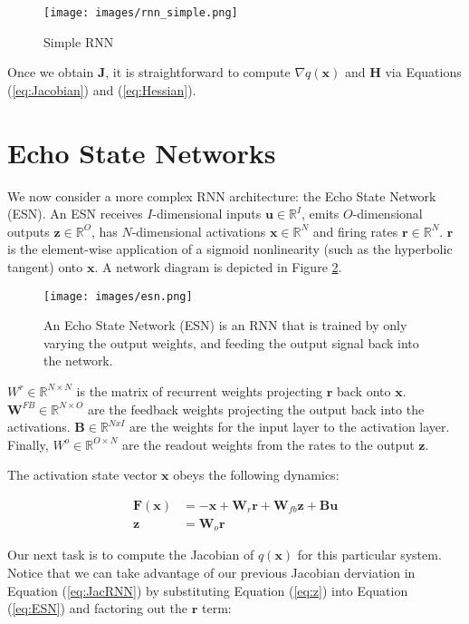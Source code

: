 \documentclass{article} %
\newcommand{\bf}[1]{\mathbf{#1}}
\newcommand{\x}{\bf{x}}
\newcommand{\J}{\bf{J}}
\begin{document}
\begin{figure}
\centering
\texttt{[image: images/rnn\_simple.png]}
\caption{Simple RNN}
\label{fig:simple_rnn}
\end{figure}

Once we obtain $\J$, it is straightforward to compute $\nabla q(\x)$ and $\bf{H}$ via Equations (\ref{eq:Jacobian}) and (\ref{eq:Hessian}).

\section{Echo State Networks}


We now consider a more complex RNN architecture: the Echo State Network (ESN). An ESN receives $I$-dimensional inputs $\bf{u} \in \mathbb{R}^I$, emits $O$-dimensional outputs $\bf{z} \in \mathbb{R}^O$, has $N$-dimensional activations $\x \in \mathbb{R}^N$ and firing rates $\bf{r} \in \mathbb{R}^N$. $\bf{r}$ is the element-wise application of a sigmoid nonlinearity (such as the hyperbolic tangent) onto $\x$. A network diagram is depicted in Figure \ref{fig:esn_arch}.

\begin{figure}
\centering
\texttt{[image: images/esn.png]}
\caption{An Echo State Network (ESN) is an RNN that is trained by only varying the output weights, and feeding the output signal back into the network.}
\label{fig:esn_arch}
\end{figure}

$W^r \in \mathbb{R}^{N \times N}$ is the matrix of recurrent weights projecting $\bf{r}$ back onto $\x$. $\bf{W}^{FB} \in \mathbb{R}^{N \times O}$ are the feedback weights projecting the output back into the activations.
$\bf{B} \in \mathbb{R}^{N x I}$ are the weights for the input layer to the activation layer. Finally, $W^o \in \mathbb{R}^{O \times N}$ are the readout weights from the rates to the output $\bf{z}$.

The activation state vector $\x$ obeys the following dynamics:

\begin{align}
  \bf{F}(\x) &= -\x + \bf{W}_{r}\bf{r}+\bf{W}_{fb}{\bf{z}}+\bf{B}\bf{u} \label{eq:ESN} \\
  \bf{z} &= \bf{W}_o \bf{r} \label{eq:z}
\end{align}

Our next task is to compute the Jacobian of $q(\x)$ for this particular system. Notice that we can take advantage of our previous Jacobian derviation in Equation (\ref{eq:JacRNN}) by substituting Equation (\ref{eq:z}) into Equation (\ref{eq:ESN}) and factoring out the $\bf{r}$ term:
\end{document}
